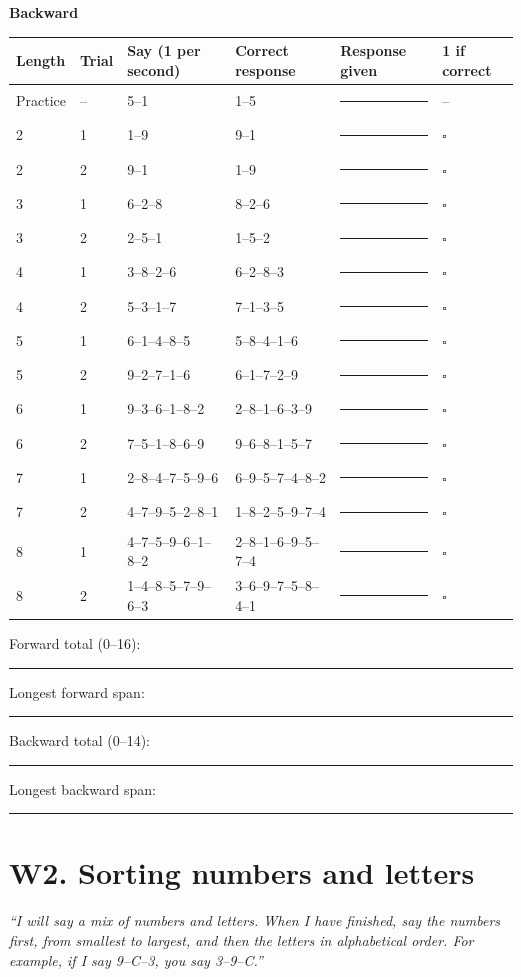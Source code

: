 \documentclass[10pt,a4paper]{article}
\newcommand{\blank}[1][1.2cm]{\rule{#1}{0.4pt}}
\newcommand{\bx}{$\square$}
\begin{document}
\par{}\medskip\textbf{Backward}\par\begin{longtable}{@{}llp{4.2cm}p{4.2cm}p{3.4cm}l@{}}\toprule Length & Trial & Say (1 per second) & Correct response & Response given & 1 if correct\\ \midrule\endhead
Practice & -- & 5--1 & 1--5 & \blank[3.2cm] & --\\ \midrule
2 & 1 & 1--9 & 9--1 & \blank[3.2cm] & \bx\\
2 & 2 & 9--1 & 1--9 & \blank[3.2cm] & \bx\\\midrule
3 & 1 & 6--2--8 & 8--2--6 & \blank[3.2cm] & \bx\\
3 & 2 & 2--5--1 & 1--5--2 & \blank[3.2cm] & \bx\\\midrule
4 & 1 & 3--8--2--6 & 6--2--8--3 & \blank[3.2cm] & \bx\\
4 & 2 & 5--3--1--7 & 7--1--3--5 & \blank[3.2cm] & \bx\\\midrule
5 & 1 & 6--1--4--8--5 & 5--8--4--1--6 & \blank[3.2cm] & \bx\\
5 & 2 & 9--2--7--1--6 & 6--1--7--2--9 & \blank[3.2cm] & \bx\\\midrule
6 & 1 & 9--3--6--1--8--2 & 2--8--1--6--3--9 & \blank[3.2cm] & \bx\\
6 & 2 & 7--5--1--8--6--9 & 9--6--8--1--5--7 & \blank[3.2cm] & \bx\\\midrule
7 & 1 & 2--8--4--7--5--9--6 & 6--9--5--7--4--8--2 & \blank[3.2cm] & \bx\\
7 & 2 & 4--7--9--5--2--8--1 & 1--8--2--5--9--7--4 & \blank[3.2cm] & \bx\\\midrule
8 & 1 & 4--7--5--9--6--1--8--2 & 2--8--1--6--9--5--7--4 & \blank[3.2cm] & \bx\\
8 & 2 & 1--4--8--5--7--9--6--3 & 3--6--9--7--5--8--4--1 & \blank[3.2cm] & \bx\\\midrule
\bottomrule\end{longtable}
Forward total (0--16): \blank \quad Longest forward span: \blank \qquad Backward total (0--14): \blank \quad Longest backward span: \blank
\section*{W2. Sorting numbers and letters}
\textit{``I will say a mix of numbers and letters. When I have finished, say the numbers first, from smallest to largest, and then the letters in alphabetical order. For example, if I say 9--C--3, you say 3--9--C.''}
\end{document}
